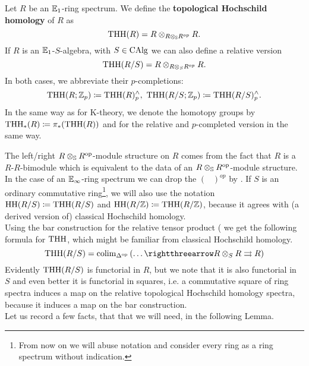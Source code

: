 \begin{defn}
    Let $R$ be an $\mathbb{E}_1$-ring spectrum.
    We define the \textbf{topological Hochschild homology} of $R$ as 
    \begin{equation*}
        \operatorname{THH}(R)=R\otimes_{R\otimes_{\mathbb{S}} R^{op}}R.
    \end{equation*}
    If $R$ is an $\mathbb{E}_1$-$S$-algebra, with $S\in\operatorname{CAlg}$ we can also define a relative version
    \begin{equation*}
        \operatorname{THH}(R/S)=R\otimes_{R\otimes_S R^{op}}R.
    \end{equation*}
    In both cases, we abbreviate their $p$-completions:
    \begin{equation*}
        \THH(R;\Z_p)\coloneqq\THH(R)^{\wedge}_p,\ \THH(R/S;\Z_p)\coloneqq\THH(R/S)^{\wedge}_p.
    \end{equation*}
    In the same way as for K-theory, we denote the homotopy groups by $\operatorname{THH}_*(R)\coloneqq \pi_*(\operatorname{THH}(R))$ and for the relative and $p$-completed version in the same way.
\end{defn}
The left/right $R\otimes_{\mathbb{S}} R^{\operatorname{op}}$-module structure on $R$ comes from the fact that $R$ is a $R$-$R$-bimodule which is equivalent to the data of an $R\otimes_{\mathbb{S}} R^{\operatorname{op}}$-module structure. 
In the case of an $\mathbb{E}_\infty$-ring spectrum we can drop the $(\phantom{R})^{op}$ by \cite[Section~4.6.3]{lurie2017higher}. 
If $S$ is an ordinary commutative ring\footnote{From now on we will abuse notation and consider every ring as a ring spectrum without indication.}, we will also use the notation $\operatorname{HH}(R/S)\coloneqq \operatorname{THH}(R/S)$ and $\operatorname{HH}(R/\mathbb{Z})\coloneqq \operatorname{THH}(R/\mathbb{Z})$, because it agrees with (a derived version of) classical Hochschild homology. \\ 
Using the bar construction for the relative tensor product (\cite[Section~4.4.2]{lurie2017higher} we get the following formula for $\operatorname{THH}$, which might be familiar from classical Hochschild homology.
\begin{equation*}
    \THH(R/S)=\colim_{\Delta^{\op}}\left(\dots \rightthreearrow R\otimes_S R\rightrightarrows R\right)
\end{equation*}
Evidently $\operatorname{THH}(R/S)$ is functorial in $R$, but we note that it is also functorial in $S$ and even better it is functorial in squares, i.e. a commutative square of ring spectra induces a map on the relative topological Hochschild homology spectra, because it induces a map on the bar construction.
\\
Let us record a few facts, that that we will need, in the following Lemma.
